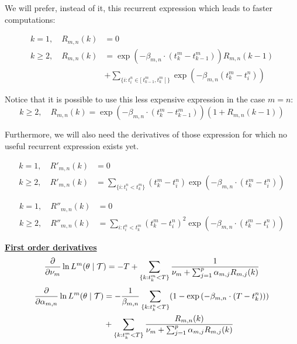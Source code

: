We will prefer, instead of it, this recurrent expression which leads to faster computations:

\begin{align*}
k = 1, \quad R_{m,n} (k) &= 0 \\
k \geq 2, \quad R_{m,n} (k) &= \exp ( - \beta_{m,n} \cdot ( t_k^m - t^m_{k-1} ) ) R_{m,n} (k-1) \\ 
& + \sum_{ \{i: t_i^n \in [ \ t_{k-1}^m, t_k^m \ [ \  \} } \exp ( - \beta_{m,n} ( t^m_k - t_i^n ) )
\end{align*}


\begin{remarque}
Notice that it is possible to use this less expensive expression in the case $m=n$: 
$$k \geq 2, \quad R_{m,n} (k) = \exp ( - \beta_{m,n} \cdot ( t_k^m - t^m_{k-1} ) ) (1 + R_{m,n} (k-1))$$

\end{remarque}

Furthermore, we will also need the derivatives of those expression for which no useful recurrent expression exists yet. 


\begin{align*}
k = 1, \quad R'_{m,n} (k) &= 0 \\
k \geq 2, \quad R'_{m,n} (k) &= \sum_{ \{i : t_i^n < t_k^m \} } (t_k^m - t_i^n)  \exp \left ( - \beta_{m,n} \cdot ( t_k^m - t_i^n ) \right )
\end{align*}


\begin{align*}
k = 1, \quad R''_{m,n} (k) &= 0 \\
k \geq 2, \quad R''_{m,n} (k) &= \sum_{i : t_i^n < t_k^m } (t_k^m - t_i^n)^2  \exp ( - \beta_{m,n} \cdot ( t_k^m - t_i^n ) )
\end{align*}















\vspace{0.6 cm}
\underline{\textbf{First order derivatives}}
\begin{equation}
\frac{\partial } {\partial \nu_m} \ln L^m ( \theta \mid \mathcal{T} ) = - T + \sum_{ \{k : t_k^m < T \} } \frac 1 {\nu_m + \sum_{j=1}^p \alpha_{m,j} R_{m,j} (k)}
\end{equation}
\begin{align}
\frac{\partial  } {\partial \alpha_{m,n}} \ln L^m ( \theta \mid \mathcal{T} ) &= - \frac 1 {\beta_{m,n}} \sum_{ \{k : t_k^n < T \} } ( 1 - \exp \left ( - \beta_{m,n} \cdot ( T - t_k^n ) \right ) ) \notag \\ &+ \sum_{ \{k : t_k^m < T \} } \frac{R_{m,n}(k)}{\nu_m + \sum_{j=1}^p \alpha_{m,j} R_{m,j} (k)}
\end{align}

